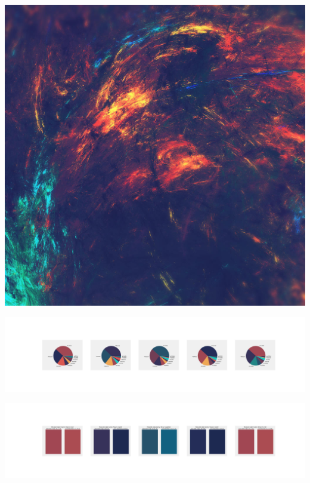 \documentclass[11pt]{article}
\begin{document}
\begin{landscape}
    \begin{center}
    \includegraphics[width=\textwidth]{./nbimg/file (182).jpg}
    \end{center}

    \begin{center}
    \includegraphics[width=250mm]{./nbimg/pie-92.jpg}
    \end{center}

    \begin{center}
    \includegraphics[width=250mm]{./nbimg/peak-92.jpg}
    \end{center}
    


\end{landscape}
\end{document}
